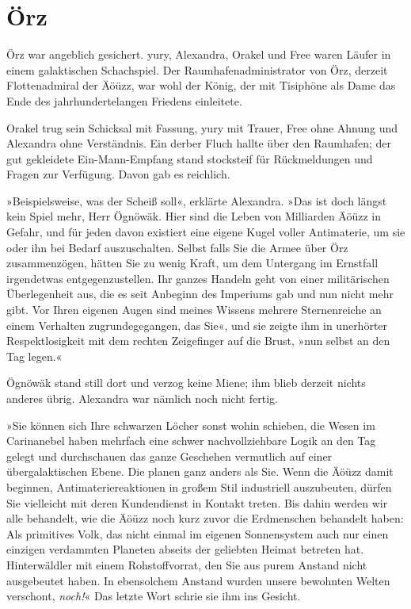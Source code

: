 \chapter{Örz}

Örz war angeblich gesichert. yury, Alexandra, Orakel und Free waren Läufer in einem galaktischen Schachspiel. Der Raumhafenadministrator von Örz, derzeit Flottenadmiral der Äöüzz, war wohl der König, der mit Tisiphöne als Dame das Ende des jahrhundertelangen Friedens einleitete.

Orakel trug sein Schicksal mit Fassung, yury mit Trauer, Free ohne Ahnung und Alexandra ohne Verständnis. Ein derber Fluch hallte über den Raumhafen; der gut gekleidete Ein-Mann-Empfang stand stocksteif für Rückmeldungen und Fragen zur Verfügung. Davon gab es reichlich.

»Beispielsweise, was der Scheiß soll«, erklärte Alexandra. »Das ist doch längst kein Spiel mehr, Herr Ögnöwäk. Hier sind die Leben von Milliarden Äöüzz in Gefahr, und für jeden davon existiert eine eigene Kugel voller Antimaterie, um sie oder ihn bei Bedarf auszuschalten. Selbst falls Sie die Armee über Örz zusammenzögen, hätten Sie zu wenig Kraft, um dem Untergang im Ernstfall irgendetwas entgegenzustellen. Ihr ganzes Handeln geht von einer militärischen Überlegenheit aus, die es seit Anbeginn des Imperiums gab und nun nicht mehr gibt. Vor Ihren eigenen Augen sind meines Wissens mehrere Sternenreiche an einem Verhalten zugrundegegangen, das Sie«, und sie zeigte ihm in unerhörter Respektlosigkeit mit dem rechten Zeigefinger auf die Brust, »nun selbst an den Tag legen.«

Ögnöwäk stand still dort und verzog keine Miene; ihm blieb derzeit nichts anderes übrig. Alexandra war nämlich noch nicht fertig.

»Sie können sich Ihre schwarzen Löcher sonst wohin schieben, die Wesen im Carinanebel haben mehrfach eine schwer nachvollziehbare Logik an den Tag gelegt und durchschauen das ganze Geschehen vermutlich auf einer übergalaktischen Ebene. Die planen ganz anders als Sie. Wenn die Äöüzz damit beginnen, Antimateriereaktionen in großem Stil industriell auszubeuten, dürfen Sie vielleicht mit deren Kundendienst in Kontakt treten. Bis dahin werden wir alle behandelt, wie die Äöüzz noch kurz zuvor die Erdmenschen behandelt haben: Als primitives Volk, das nicht einmal im eigenen Sonnensystem auch nur einen einzigen verdammten Planeten abseits der geliebten Heimat betreten hat. Hinterwäldler mit einem Rohstoffvorrat, den Sie aus purem Anstand nicht ausgebeutet haben. In ebensolchem Anstand wurden unsere bewohnten Welten verschont, \emph{noch!}« Das letzte Wort schrie sie ihm ins Gesicht.

